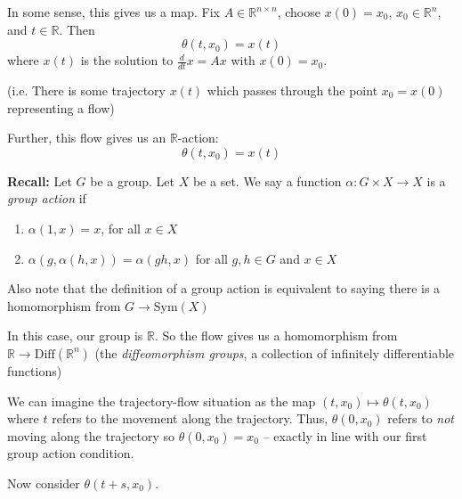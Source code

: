 \documentclass[12pt]{article}
\newcommand{\R}{\mathbb{R}}
\begin{document}
    In some sense, this gives us a map. Fix $A \in \R^{n \times n}$, choose $x(0) = x_0$, $x_0 \in \R^n$, and $t \in \R$. Then 
    \[\theta(t, x_0) = x(t)\]
    where $x(t)$ is the solution to $\frac{d}{dt}x = Ax$ with $x(0) = x_0$.

    (i.e. There is some trajectory $x(t)$ which passes through the point $x_0 = x(0)$ representing a flow) 
    
    Further, this flow gives us an $\R$-action: 
    \[\theta(t, x_0) = x(t)\] 

    \textbf{Recall:} Let $G$ be a group. Let $X$ be a set. We say a function $\alpha: G \times X \to X$ is a \emph{group action} if 
    \begin{enumerate}
        \item $\alpha(1, x) = x$, for all $x \in X$ 
        \item $\alpha(g, \alpha(h, x)) = \alpha(gh, x)$ for all $g, h \in G$ and $x \in X$
    \end{enumerate}

    Also note that the definition of a group action is equivalent to saying there is a homomorphism from $G \to \text{Sym}(X)$ 

    In this case, our group is $\R$. So the flow gives us a homomorphism from $\R \to \text{Diff}(\R^n)$ 
    (the \emph{diffeomorphism groups}, a collection of infinitely differentiable functions)

    We can imagine the trajectory-flow situation as the map $(t, x_0) \mapsto \theta(t, x_0)$ where $t$ refers to the movement along the trajectory. Thus, $\theta(0, x_0)$ refers to \emph{not} moving along the trajectory so $\theta(0, x_0) = x_0$ -- exactly in line with our first group action condition. 

    Now consider $\theta(t + s, x_0)$. 

\end{document}
